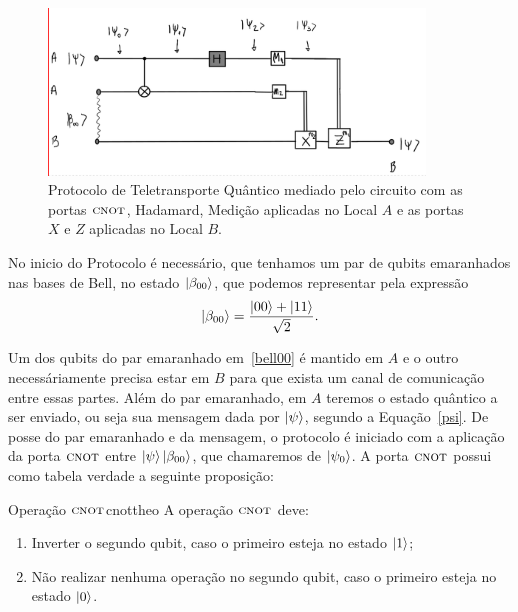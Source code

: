 \begin{figure}[ht!]
\centering
\includegraphics[width=10cm]{PROTOCOLOTELETRANSPORTE.png}
\caption{Protocolo de Teletransporte Quântico mediado pelo circuito com as portas \(\operatorname{\textsc{cnot}}\), Hadamard, Medição aplicadas no Local \(A\) e as portas \(X\) e \(Z\) aplicadas no Local \(B\).}\label{protocoloteletransporte}
\end{figure}

No inicio do Protocolo é necessário, que tenhamos um par de qubits emaranhados nas bases de Bell, no estado $\ket{\beta_{00}}$, que podemos representar pela expressão
\begin{equation}\label{bell00}
 \ket{\beta_{00}} = \frac{\ket{00} + \ket{11}}{\sqrt{2}}.
\end{equation}

Um dos qubits do par emaranhado em~\eqref{bell00} é mantido em \(A\) e o outro necessáriamente precisa estar em \(B\) para que exista um canal de comunicação entre essas partes. Além do par emaranhado, em \(A\) teremos o estado quântico a ser enviado, ou seja sua mensagem dada por $\ket{\psi}$, segundo a Equação~\eqref{psi}.
De posse do par emaranhado e da mensagem, o protocolo é iniciado com a aplicação da porta \(\operatorname{\textsc{cnot}}\) entre $\ket{\psi}\ket{\beta_{00}}$, que chamaremos de $\ket{\psi_0}$. A porta \(\operatorname{\textsc{cnot}}\) possui como tabela verdade a seguinte proposição:

\begin{theo}{Operação \(\operatorname{\textsc{cnot}}\)}{cnottheo}
  A operação \(\operatorname{\textsc{cnot}}\) deve:
  \begin{enumerate}[label=\roman*.,left=0pt]
    \item Inverter o segundo qubit, caso o primeiro esteja no estado $\ket{1}$;
    \item Não realizar nenhuma operação no segundo qubit, caso o primeiro esteja no estado $\ket{0}$.
  \end{enumerate}
\end{theo}

